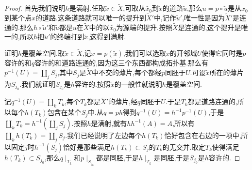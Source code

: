 \begin{enumerate}
\begin{proof}
		首先我们说明$h$是满射.任取$\widetilde{x}\in\widetilde{X}$,可取从$\widetilde{x_0}$到$\widetilde{x}$的道路$\widetilde{u}$,那么$u=p\circ\widetilde{u}$是从$x_0$到某个点$x$的道路.这条道路就可以唯一的提升到$\widetilde{X}'$中,记作$\widetilde{u}'$,唯一性是因为$\widetilde{X}'$是连通的.那么$h\circ\widetilde{u}'$和$\widetilde{u}$都是$u$在$\widetilde{X}$中的以$\widetilde{x_0}$为源端的提升.按照$\widetilde{X}$是连通的,这个提升是唯一的,所以$h$把$\widetilde{u}'$的终端打到$\widetilde{x}$,这得到满射.
		
		\qquad
		
		证明$h$是覆盖空间.取$\widetilde{x}\in\widetilde{X}$,记$x=p(\widetilde{x})$,我们可以选取$x$的开邻域$U$使得它同时是$p$容许的和$q$容许的和道路连通的,因为这三个东西都构成拓扑基.那么有$p^{-1}(U)=\coprod_jS_j$,其中$S_j$是$\widetilde{X}$中不交的薄片,每个都经$p$同胚于$U$.可设$\widetilde{x}$所在的薄片为$S_{j_0}$.我们就证明$S_{j_0}$是$h$容许的.按照$\widetilde{x}$的一般性就说明$h$是覆盖空间.
		
		\qquad
		
		记$q^{-1}(U)=\coprod_kT_k$,每个$T_k$都是$\widetilde{X}'$的薄片,经$q$同胚于$U$.于是$T_k$都是道路连通的,所以每个$h(T_k)$包含在某个$S_j$中.从$q=ph$得到$q^{-1}(U)=h^{-1}p^{-1}(U)$,于是$\coprod_kT_k=h^{-1}(\coprod_jS_j)$.按照$h$是满射,就有$hh^{-1}(A)=A$,所以有$\coprod_kh(T_k)=\coprod_jS_j$.我们已经说明了左边每个$h(T_k)$恰好包含在右边的一项中,所以固定$j$时$h^{-1}(S_j)$恰好是那些满足$h(T_k)\subset S_j$的$T_k$的无交并.取定$T_k$使得满足$h(T_k)\subset S_{j_0}$,那么$q\mid_{T_k}$和$p\mid_{S_{j_0}}$都是同胚,于是$h\mid_{T_k}$是同胚,于是$S_{j_0}$是$h$容许的.
	\end{proof}
\end{enumerate}

